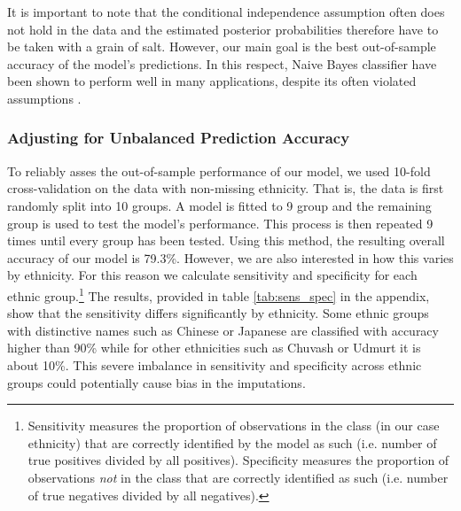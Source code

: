 It is important to note that the conditional independence assumption often does not hold in the data and the estimated posterior probabilities therefore have to be taken with a grain of salt. %
However, our main goal is the best out-of-sample accuracy of the model's predictions. In this respect, Naive Bayes classifier have been shown to perform  well in many applications, despite its often violated assumptions \citep{domingos_optimality_1997}.

\subsubsection{Adjusting for Unbalanced Prediction Accuracy} \label{subsubsec:pred_adj}
To reliably asses the out-of-sample performance of our model, we used 10-fold cross-validation on the data with non-missing ethnicity. That is, the data is first randomly split into 10 groups. A model is fitted to 9 group and the remaining group is used to test the model's performance. This process is then repeated 9 times  until every group has been tested. 
Using this method, the resulting overall accuracy of our model is 79.3\%. However,  we are also interested in  how this varies by ethnicity.
For this reason we calculate sensitivity and specificity for each ethnic group.\footnote{Sensitivity measures the proportion of observations in the class (in our case ethnicity) that are correctly identified by the model as such (i.e. number of true positives divided by all positives). Specificity measures the proportion of observations \emph{not} in the class that are correctly identified as such (i.e. number of true negatives divided by all negatives).} 
The results, provided in table \ref{tab:sens_spec} in the appendix, show that the sensitivity differs significantly by ethnicity. 
Some ethnic groups with distinctive names such as Chinese or Japanese are classified  with accuracy higher than 90\%  while for other ethnicities such as Chuvash or Udmurt it is about 10\%. This severe imbalance in sensitivity and specificity  across ethnic groups could potentially cause bias in the imputations. 

